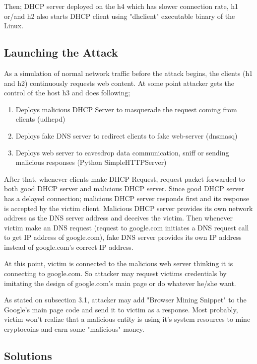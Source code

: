\documentclass[conference,compsoc]{IEEEtran}
\begin{document}
Then; DHCP server deployed on the h4 which has slower connection rate, h1 or/and h2 also starts DHCP client using "dhclient" executable binary of the Linux. 

\subsection{Launching the Attack}

As a simulation of normal network traffic before the attack begins, the clients (h1 and h2) continuously requests web content. At some point attacker gets the control of the host h3 and does following;

 \begin{enumerate}
 \item Deploys malicious DHCP Server to masquerade the request coming from clients (udhcpd)
 \item Deploys fake DNS server to redirect clients to fake web-server (dnsmasq)
 \item Deploys web server to eavesdrop data communication, sniff or sending malicious  responses (Python SimpleHTTPServer)
 \end{enumerate}
 
After that, whenever clients make DHCP Request, request packet forwarded to both good DHCP server and malicious DHCP server. Since good DHCP server has a delayed connection; malicious DHCP server responds first and its response is accepted by the victim client. Malicious DHCP server provides its own network address as the DNS server address and deceives the victim. Then whenever victim make an DNS request (request to google.com initiates a DNS request call to get IP address of google.com), fake DNS server provides its own IP address instead of google.com's correct IP address. 

At this point, victim is connected to the malicious web server thinking it is connecting to google.com. So attacker may request victims credentials by imitating the design of google.com's main page or do whatever he/she want.

As stated on subsection 3.1, attacker may add "Browser Mining Snippet" to the Google's main page code and send it to victim as a response. Most probably, victim won't realize that a malicious entity is using it's system resources to mine cryptocoins and earn some "malicious" money.

\subsection{Solutions}
\end{document}
